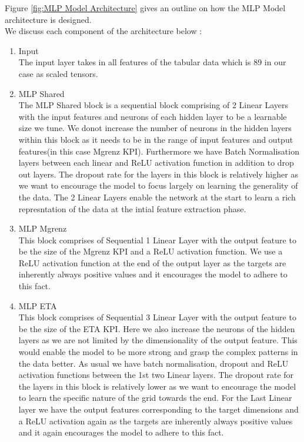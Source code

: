 \documentclass{report} %
\begin{document}
Figure \ref{fig:MLP Model Architecture} gives an outline on how the \ac{MLP} Model architecture is designed. \\

We discuss each component of the architecture below :
\begin{enumerate}
    \item Input \\
    The input layer takes in all features of the tabular data which is 89 in our case as scaled tensors.
    \item MLP Shared \\
    The MLP Shared block is a sequential block comprising of 2 Linear Layers with the input features and neurons of each hidden layer to be a learnable size we tune.
    We donot increase the number of neurons in the hidden layers within this block as it needs to be in the range of input features and output features(in this case Mgrenz \ac{KPI}).
    Furthermore we have Batch Normalisation layers between each linear and \ac{ReLU} activation function in addition to drop out layers.
    The dropout rate for the layers in this block is relatively higher as we want to encourage the model to focus largely on learning the generality of the data.
    The 2 Linear Layers enable the network at the start to learn a rich represntation of the data at the intial feature extraction phase.
    \item MLP Mgrenz \\
    This block comprises of Sequential 1 Linear Layer with the output feature to be the size of the Mgrenz \ac{KPI} and a \ac{ReLU} activation function.
    We use a \ac{ReLU} activation function at the end of the output layer as the targets are inherently always positive values and it encourages the model to adhere to this fact.
    \item MLP ETA \\
    This block comprises of Sequential 3 Linear Layer with the output feature to be the size of the ETA \ac{KPI}.
    Here we also increase the neurons of the hidden layers as we are not limited by the dimensionality of the output feature.
    This would enable the model to be more strong and grasp the complex patterns in the data better.
    As usual we have batch normalisation, dropout and \ac{ReLU} activation functions between the 1st two Linear layers.
    The dropout rate for the layers in this block is relatively lower as we want to encourage the model to learn the specific nature of the grid towards the end.
    For the Last Linear layer we have the output features corresponding to the target dimensions and a \ac{ReLU} activation again as the targets are inherently always positive values and it again encourages the model to adhere to this fact.

\end{enumerate}
\end{document}
